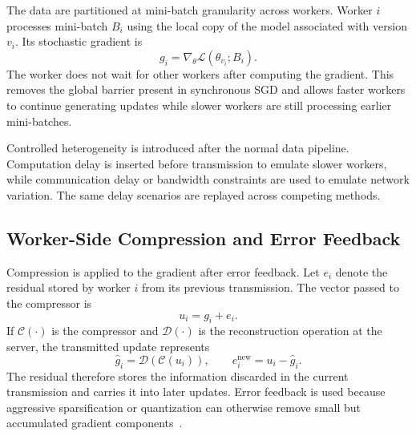 \documentclass[conference]{IEEEtran}
\begin{document}
The data are partitioned at mini-batch granularity across workers. Worker $i$ processes mini-batch $B_i$ using the local copy of the model associated with version $v_i$. Its stochastic gradient is
\begin{equation}
 g_i=\nabla_{\theta}\mathcal{L}(\theta_{v_i};B_i).
 \label{eq:gradient}
\end{equation}
The worker does not wait for other workers after computing the gradient. This removes the global barrier present in synchronous SGD and allows faster workers to continue generating updates while slower workers are still processing earlier mini-batches.

Controlled heterogeneity is introduced after the normal data pipeline. Computation delay is inserted before transmission to emulate slower workers, while communication delay or bandwidth constraints are used to emulate network variation. The same delay scenarios are replayed across competing methods.

\subsection{Worker-Side Compression and Error Feedback}
\label{subsec:compression}

Compression is applied to the gradient after error feedback. Let $e_i$ denote the residual stored by worker $i$ from its previous transmission. The vector passed to the compressor is
\begin{equation}
 u_i=g_i+e_i.
 \label{eq:ef}
\end{equation}
If $\mathcal{C}(\cdot)$ is the compressor and $\mathcal{D}(\cdot)$ is the reconstruction operation at the server, the transmitted update represents
\begin{equation}
 \hat g_i=\mathcal{D}\!\left(\mathcal{C}(u_i)\right),
 \qquad
 e_i^{\mathrm{new}}=u_i-\hat g_i.
 \label{eq:residual}
\end{equation}
The residual therefore stores the information discarded in the current transmission and carries it into later updates. Error feedback is used because aggressive sparsification or quantization can otherwise remove small but accumulated gradient components~\cite{aji2017sparse,alistarh2017qsgd,karimireddy2019ef}.
\end{document}

